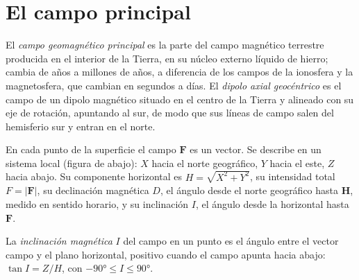 \section{El campo principal}

\begin{definition}\label{def:b3:palaeomagnetism:main-field}
El \emph{campo geomagnético principal} es la
parte del campo magnético terrestre producida en el interior de la Tierra, en su
núcleo externo líquido de hierro; cambia de años a millones de años, a diferencia de los campos de la
ionosfera y la magnetosfera, que cambian en segundos a días. El
\emph{dipolo axial geocéntrico} es el campo de un
dipolo magnético situado en el centro de la Tierra y alineado
con su eje de rotación, apuntando al sur, de modo que sus líneas de campo salen del hemisferio sur y
entran en el norte.
\end{definition}

En cada punto de la superficie el campo $\mathbf F$ es un vector. Se describe
en un sistema local (figura de abajo): $X$ hacia el norte geográfico, $Y$ hacia el
este, $Z$ hacia abajo. Su componente horizontal es $H = \sqrt{X^2 + Y^2}$, su
intensidad total $F = |\mathbf F|$, su declinación magnética $D$, el ángulo desde
el norte geográfico hasta $\mathbf H$, medido en sentido horario, y su inclinación $I$, el
ángulo desde la horizontal hasta $\mathbf F$.

\begin{definition}\label{def:b3:palaeomagnetism:inclination}
La \emph{inclinación magnética} $I$ del campo en
un punto es el ángulo entre el vector campo y el plano horizontal,
positivo cuando el campo apunta hacia abajo: $\tan I = Z/H$, con $-\ang{90} \le I
\le \ang{90}$.
\end{definition}

